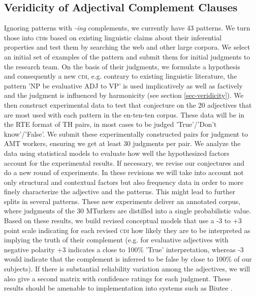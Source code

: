 \documentclass[10pt]{article}
\begin{document}
 
\vspace{-.1in}
\subsection{Veridicity of Adjectival Complement Clauses}

\vspace {-3mm}

Ignoring patterns with \emph{-ing} complements, we currently have 43 patterns. We turn those into \textsc{cdi}s based on existing linguistic claims about their inferential properties and test them by searching the web and other large corpora. We select an initial set of examples of the pattern and submit them for initial judgments to the research team. On the basis of their judgments, we formulate a hypothesis and consequently a new \textsc{cdi}, e.g. contrary to existing linguistic literature, the pattern 'NP be evaluative ADJ to VP' is used implicatively as well as factively and the judgment is influenced by harmonicity (see section \ref{sec-veridicity}). We then construct experimental data to test that conjecture on the 20 adjectives that are most used with each pattern in the en-ten-ten corpus. These data will be in the RTE format of TH pairs, in most cases to be judged 'True'/'Don't know'/'False'. We submit these experimentally constructed pairs for judgment to AMT workers, ensuring we get at least 30 judgments per pair. We analyze the data using statistical models to evaluate how well the hypothesized factors account for the experimental results. If necessary, we revise our conjectures and do a new round of experiments. In these revisions we will take into account not only structural and contextual factors but also frequency data in order to more finely characterize the adjective and the patterns. This might lead to further splits in several patterns. These new experiments deliver an annotated corpus, where judgments of the 30 MTurkers are distilled into a single probabilistic value. 
 Based on these results, we build revised conceptual models that use a -3 to +3 point scale indicating for each revised \textsc{cdi} how likely they are to be interpreted as implying the truth of their complement (e.g. for evaluative adjectives with negative polarity +3 indicates a close to 100\% 'True' interpretation, whereas -3 would indicate that the complement is inferred to be false by close to 100\% of our subjects). If there is substantial reliability variation among the adjectives, we will also give a second matrix with confidence ratings for each judgment.  These results should be amenable to implementation into systems such as Biutee \cite{biutee}.
\end{document}
